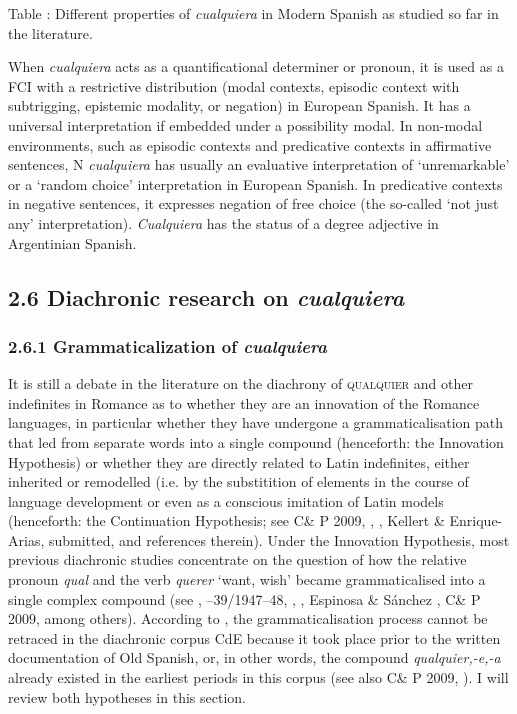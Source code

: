\documentclass[output=paper]{langscibook}
\begin{document}
\begin{styletablecaption}
Table : Different properties of \textit{cualquiera} in Modern Spanish as studied so far in the literature.
\end{styletablecaption}

When \textit{cualquiera} acts as a quantificational determiner or pronoun, it is used as a FCI with a restrictive distribution (modal contexts, episodic context with subtrigging, epistemic modality, or negation) in European Spanish. It has a universal interpretation if embedded under a possibility modal. In non-modal environments, such as episodic contexts and predicative contexts in affirmative sentences, N \textit{cualquiera} has usually an evaluative interpretation of ‘unremarkable’ or a ‘random choice’ interpretation in European Spanish. In predicative contexts in negative sentences, it expresses negation of free choice (the so-called ‘not just any’ interpretation). \textit{Cualquiera} has the status of a degree adjective in Argentinian Spanish.

\subsection{\textbf{2.6} \textbf{Diachronic} \textbf{research} \textbf{on} \textbf{\textit{cualquiera}}}
\subsubsection{\textbf{2.6.1} \textbf{Grammaticalization} \textbf{of} \textbf{\textit{cualquiera}} }

It is still a debate in the literature on the diachrony of \textsc{qualquier} and other indefinites in Romance as to whether they are an innovation of the Romance languages, in particular whether they have undergone a grammaticalisation path that led from separate words into a single compound (henceforth: the Innovation Hypothesis) or whether they are directly related to Latin indefinites, either inherited or remodelled (i.e. by the substitition of elements in the course of language development or even as a conscious imitation of Latin models (henceforth: the Continuation Hypothesis; see C\& P 2009, \citealt{Pato2012}, \citealt{Mackenzie2019}, Kellert \& Enrique-Arias, submitted, and references therein). Under the Innovation Hypothesis, most previous diachronic studies concentrate on the question of how the relative pronoun \textit{qual} and the verb \textit{querer} ‘want, wish’ became grammaticalised into a single complex compound (see \citealt{Palomo1934}, \citealt{Lombard1938}–39/1947–48, \citealt{Meier1950}, \citealt{Rivero1988}, Espinosa \& Sánchez \citealt{Lancis2006}, C\& P 2009, among others). According to \citet{AloniEtAl2010}, the grammaticalisation process cannot be retraced in the diachronic corpus CdE because it took place prior to the written documentation of Old Spanish, or, in other words, the compound \textit{qualquier,\nobreakdash-e,\nobreakdash-a} already existed in the earliest periods in this corpus (see also C\& P 2009, \citealt{Rivero1988}). I will review both hypotheses in this section.
\end{document}
